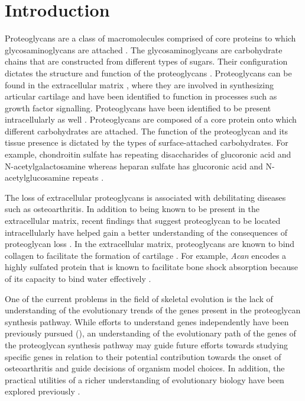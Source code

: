 \documentclass{article}
\begin{document}
\section*{Introduction}
Proteoglycans are a class of macromolecules comprised of core proteins to which glycosaminoglycans are attached \cite{pg_struct_func}. The glycosaminoglycans are carbohydrate chains that are constructed from different types of sugars. Their configuration dictates the structure and function of the proteoglycans \cite{pg_chapter}. Proteoglycans can be found in the extracellular matrix \cite{pg_aggrecan}, where they are involved in synthesizing articular cartilage and have been identified to function in processes such as growth factor signalling. Proteoglycans have been identified to be present intracellularly as well \cite{pg_intro}. Proteoglycans are composed of a core protein onto which different carbohydrates are attached. The function of the proteoglycan and its tissue presence is dictated by the types of surface-attached carbohydrates. For example, chondroitin sulfate has repeating disaccharides of glucoronic acid and N-acetylgalactosamine whereas heparan sulfate has glucoronic acid and N-acetylglucosamine repeats \cite{pg_chapter}.

The loss of extracellular proteoglycans is associated with debilitating diseases such as osteoarthritis. In addition to being known to be present in the extracellular matrix, recent findings that suggest proteoglycan to be located intracellularly have helped gain a better understanding of the consequences of proteoglycan loss \cite{pg_intro, osteo1, proteo_osteo1}. In the extracellular matrix, proteoglycans are known to bind collagen to facilitate the formation of cartilage \cite{proteo_osteo2, proteo_osteo3}. For example, \textit{Acan} encodes a highly sulfated protein that is known to facilitate bone shock absorption because of its capacity to bind water effectively \cite{proteo_osteo1, proteo_osteo3, proteo_form_function}. 

One of the current problems in the field of skeletal evolution is the lack of understanding of the evolutionary trends of the genes present in the proteoglycan synthesis pathway. While efforts to understand genes independently have been previously pursued (\cite{fam20}), an understanding of the evolutionary path of the genes of the proteoglycan synthesis pathway may guide future efforts towards studying specific genes in relation to their potential contribution towards the onset of osteoarthritis and guide decisions of organism model choices. In addition, the practical utilities of a richer understanding of evolutionary biology have been explored previously \cite{evobio}.
\end{document}
